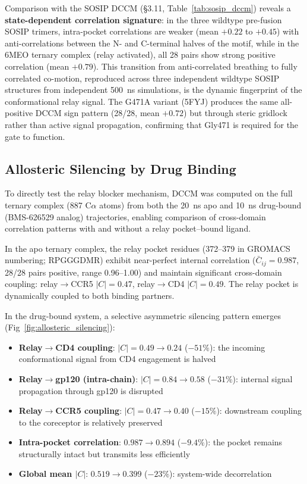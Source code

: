 \documentclass[11pt,a4paper]{article}
\begin{document}
Comparison with the SOSIP DCCM (\S3.11, Table~\ref{tab:sosip_dccm}) reveals a \textbf{state-dependent correlation signature}: in the three wildtype pre-fusion SOSIP trimers, intra-pocket correlations are weaker (mean $+0.22$ to $+0.45$) with anti-correlations between the N- and C-terminal halves of the motif, while in the 6MEO ternary complex (relay activated), all 28 pairs show strong positive correlation (mean $+0.79$). This transition from anti-correlated breathing to fully correlated co-motion, reproduced across three independent wildtype SOSIP structures from independent 500~ns simulations, is the dynamic fingerprint of the conformational relay signal. The G471A variant (5FYJ) produces the same all-positive DCCM sign pattern (28/28, mean $+0.72$) but through steric gridlock rather than active signal propagation, confirming that Gly471 is required for the gate to function.

\subsection{Allosteric Silencing by Drug Binding}

To directly test the relay blocker mechanism, DCCM was computed on the full ternary complex (887 C$\alpha$ atoms) from both the 20~ns apo and 10~ns drug-bound (BMS-626529 analog) trajectories, enabling comparison of cross-domain correlation patterns with and without a relay pocket--bound ligand.

In the apo ternary complex, the relay pocket residues (372--379 in GROMACS numbering; RPGGGDMR) exhibit near-perfect internal correlation ($\bar{C}_{ij} = 0.987$, 28/28 pairs positive, range 0.96--1.00) and maintain significant cross-domain coupling: relay$\to$CCR5 $|C| = 0.47$, relay$\to$CD4 $|C| = 0.49$. The relay pocket is dynamically coupled to both binding partners.

In the drug-bound system, a selective asymmetric silencing pattern emerges (Fig~\ref{fig:allosteric_silencing}):

\begin{itemize}[nosep,leftmargin=1.5em]
    \item \textbf{Relay$\to$CD4 coupling}: $|C| = 0.49 \to 0.24$ (\textbf{$-51\%$}): the incoming conformational signal from CD4 engagement is halved
    \item \textbf{Relay$\to$gp120 (intra-chain)}: $|C| = 0.84 \to 0.58$ ($-31\%$): internal signal propagation through gp120 is disrupted
    \item \textbf{Relay$\to$CCR5 coupling}: $|C| = 0.47 \to 0.40$ ($-15\%$): downstream coupling to the coreceptor is relatively preserved
    \item \textbf{Intra-pocket correlation}: $0.987 \to 0.894$ ($-9.4\%$): the pocket remains structurally intact but transmits less efficiently
    \item \textbf{Global mean $|C|$}: $0.519 \to 0.399$ ($-23\%$): system-wide decorrelation
\end{itemize}
\end{document}
